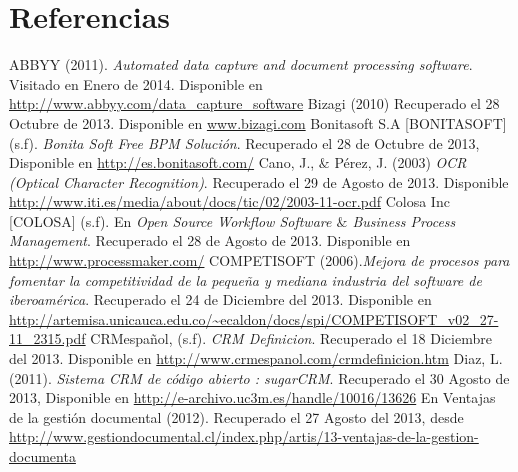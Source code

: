 \chapter{Referencias}
\newpage
\noindent
ABBYY (2011). \textit{Automated data capture and document processing software}. Visitado en Enero de 2014. Disponible en \url{http://www.abbyy.com/data_capture_software}
\newline
\newline
Bizagi (2010) Recuperado el 28 Octubre de 2013. Disponible en \url{www.bizagi.com}
\newline
\newline
Bonitasoft S.A [BONITASOFT] (s.f). \textit{Bonita Soft Free BPM Solución}. Recuperado el 28 de Octubre de 2013, Disponible  en  \url{http://es.bonitasoft.com/}
\newline
\newline
Cano, J., $\&$ Pérez, J. (2003) \textit{OCR (Optical Character Recognition)}. Recuperado el 29 de Agosto de 2013. Disponible \url{http://www.iti.es/media/about/docs/tic/02/2003-11-ocr.pdf}
\newline
\newline
Colosa Inc [COLOSA] (s.f). En \textit{Open Source Workflow Software $\&$ Business Process Management}. Recuperado el 28 de Agosto de 2013. Disponible en \url{http://www.processmaker.com/}
\newline
\newline
COMPETISOFT (2006).\textit{Mejora de procesos para fomentar la competitividad de la pequeña y mediana industria del software de iberoamérica}. Recuperado el 24 de Diciembre del 2013. Disponible en \url{http://artemisa.unicauca.edu.co/~ecaldon/docs/spi/COMPETISOFT_v02_27-11_2315.pdf}
\newline
\newline
CRMespañol, (s.f). \textit{CRM Definicion}. Recuperado el 18 Diciembre del 2013. Disponible en \url{http://www.crmespanol.com/crmdefinicion.htm}
\newline
\newline
Diaz, L. (2011). \textit{Sistema CRM de código abierto : sugarCRM}. Recuperado  el 30 Agosto de 2013, 
Disponible en \url{http://e-archivo.uc3m.es/handle/10016/13626}
\newline
\newline
En Ventajas de la gestión documental (2012). Recuperado el 27 Agosto del 2013, desde 
\url{http://www.gestiondocumental.cl/index.php/artis/13-ventajas-de-la-gestion-documenta}
\newline
\newline
